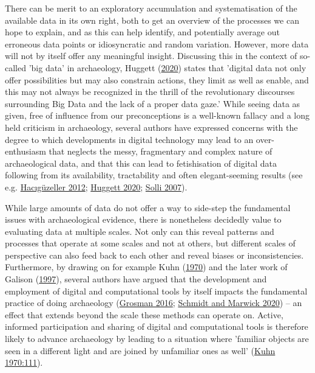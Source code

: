 \documentclass[
  12pt,
  a4paper,
  oneside]{book}
\begin{document}
There can be merit to an exploratory accumulation and systematisation of the available data in its own right, both to get an overview of the processes we can hope to explain, and as this can help identify, and potentially average out erroneous data points or idiosyncratic and random variation. However, more data will not by itself offer any meaningful insight. Discussing this in the context of so-called 'big data' in archaeology, Huggett (\protect\hyperlink{ref-huggett2020}{2020}) states that 'digital data not only offer possibilities but may also constrain actions, they limit as well as enable, and this may not always be recognized in the thrill of the revolutionary discourses surrounding Big Data and the lack of a proper data gaze.' While seeing data as given, free of influence from our preconceptions is a well-known fallacy and a long held criticism in archaeology, several authors have expressed concerns with the degree to which developments in digital technology may lead to an over-enthusiasm that neglects the messy, fragmentary and complex nature of archaeological data, and that this can lead to fetishisation of digital data following from its availability, tractability and often elegant-seeming results (see e.g. \protect\hyperlink{ref-haciguzeller2012}{Hacıgüzeller 2012}; \protect\hyperlink{ref-huggett2020}{Huggett 2020}; \protect\hyperlink{ref-solli2007}{Solli 2007}).

While large amounts of data do not offer a way to side-step the fundamental issues with archaeological evidence, there is nonetheless decidedly value to evaluating data at multiple scales. Not only can this reveal patterns and processes that operate at some scales and not at others, but different scales of perspective can also feed back to each other and reveal biases or inconsistencies. Furthermore, by drawing on for example Kuhn (\protect\hyperlink{ref-kuhn1970}{1970}) and the later work of Galison (\protect\hyperlink{ref-galison1997}{1997}), several authors have argued that the development and employment of digital and computational tools by itself impacts the fundamental practice of doing archaeology (\protect\hyperlink{ref-grosman2016}{Grosman 2016}; \protect\hyperlink{ref-schmidt2020}{Schmidt and Marwick 2020}) -- an effect that extends beyond the scale these methods can operate on. Active, informed participation and sharing of digital and computational tools is therefore likely to advance archaeology by leading to a situation where 'familiar objects are seen in a different light and are joined by unfamiliar ones as well' (\protect\hyperlink{ref-kuhn1970}{Kuhn 1970:111}).
\end{document}
